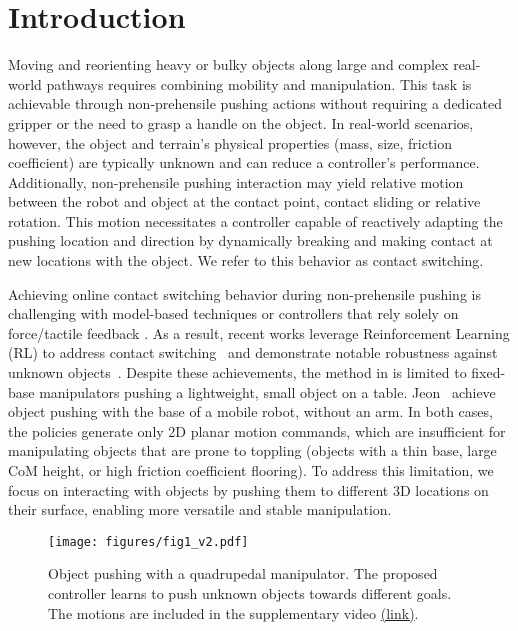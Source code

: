 \section{Introduction}
Moving and reorienting heavy or bulky objects along large and complex real-world pathways requires combining mobility and manipulation. This task is achievable through non-prehensile pushing actions without requiring a dedicated gripper or the need to grasp a handle on the object. In real-world scenarios, however, the object and terrain's physical properties (\eg mass, size, friction coefficient) are typically unknown and can reduce a controller's performance. Additionally, non-prehensile pushing interaction may yield relative motion between the robot and object at the contact point, \eg contact sliding or relative rotation. This motion necessitates a controller capable of reactively adapting the pushing location and direction by dynamically breaking and making contact at new locations with the object. We refer to this behavior as contact switching.

Achieving online contact switching behavior during non-prehensile pushing is challenging with model-based techniques \cite{hogan_hybrid_mpc, moura_to_planar_manmipulation} or controllers that rely solely on force/tactile feedback \cite{force_push_heins, ozdamar2024pushing}. As a result, recent works leverage Reinforcement Learning (RL) to address contact switching~\cite{ferrandis2023nonprehensile} and demonstrate notable robustness against unknown objects~\cite{quadruped_pushing}. Despite these achievements, the method in \cite{ferrandis2023nonprehensile} is limited to fixed-base manipulators pushing a lightweight, small object on a table. Jeon~\etal\cite{quadruped_pushing} achieve object pushing with the base of a mobile robot, without an arm. In both cases, the policies generate only 2D planar motion commands, which are insufficient for manipulating objects that are prone to toppling (\eg objects with a thin base, large CoM height, or high friction coefficient flooring). To address this limitation, we focus on interacting with objects by pushing them to different 3D locations on their surface, enabling more versatile and stable manipulation.
%
\begin{figure}
  \centering
  \graphicspath{{figures/}}
  \texttt{[image: figures/fig1\_v2.pdf]}
  \vspace{-7pt}
  \caption{Object pushing with a quadrupedal manipulator. The proposed controller learns to push unknown objects towards different goals. The motions are included in the supplementary video \href{https://youtu.be/wGAdPGVf9Ws?si=j9YNlEufzQIGlPz4}{(link)}.}
  \label{Fig:fig1}
\end{figure}


